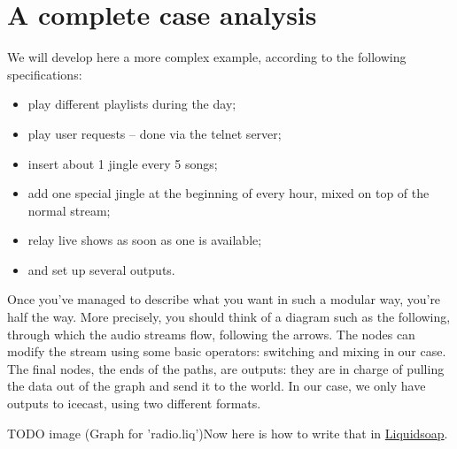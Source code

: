 \section{A complete case analysis}
We will develop here a more complex example, according to the following specifications:

\begin{itemize}
\item play different playlists during the day;
\item play user requests -- done via the telnet server;
\item insert about 1 jingle every 5 songs;
\item add one special jingle at the beginning of every hour, mixed on top of the normal stream;
\item relay live shows as soon as one is available;
\item and set up several outputs.

\end{itemize}
Once you've managed to describe what you want in such a modular way, you're half the way. More precisely, you should think of a diagram such as the following, through which the audio streams flow, following the arrows. The nodes can modify the stream using some basic operators: switching and mixing in our case. The final nodes, the ends of the paths, are outputs: they are in charge of pulling the data out of the graph and send it to the world. In our case, we only have outputs to icecast, using two different formats.

TODO image (Graph for 'radio.liq')Now here is how to write that in \href{index.html}{Liquidsoap}.

